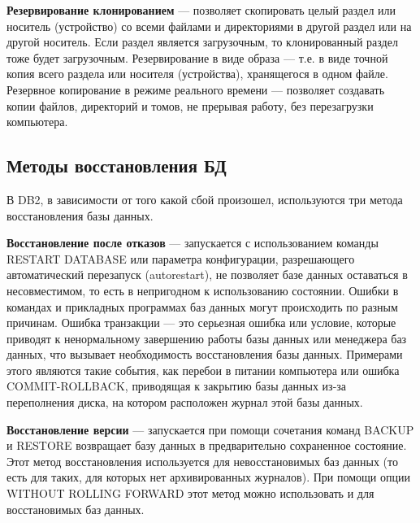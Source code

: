 \documentclass[russian,utf8,emptystyle]{eskdtext}
\begin{document}
\textbf{Резервирование клонированием} — позволяет скопировать целый раздел или носитель (устройство) со всеми файлами и директориями в другой раздел или на другой носитель. Если раздел является загрузочным, то клонированный раздел тоже будет загрузочным. Резервирование в виде образа — т.е. в виде точной копия всего раздела или носителя (устройства), хранящегося в одном
файле. Резервное копирование в режиме реального времени — позволяет создавать копии файлов, директорий и томов, не прерывая работу, без перезагрузки компьютера.

\subsection{Методы восстановления БД}
В DB2, в зависимости от того какой сбой произошел, используются три метода восстановления базы данных.

\textbf{Восстановление после отказов} — запускается с использованием команды RESTART DATABASE или параметра конфигурации, разрешающего автоматический перезапуск (autorestart), не позволяет базе данных оставаться в несовместимом, то есть в непригодном к использованию состоянии. Ошибки в командах и прикладных программах баз данных могут происходить по разным причинам. Ошибка транзакции — это серьезная ошибка или условие, которые приводят к ненормальному завершению работы базы данных или менеджера баз данных, что вызывает необходимость восстановления базы данных. Примерами этого являются такие события, как перебои в питании компьютера или ошибка COMMIT-ROLLBACK, приводящая к закрытию базы данных из-за переполнения диска, на котором расположен журнал этой базы данных.

\textbf{Восстановление версии} — запускается при помощи сочетания команд BACKUP и RESTORE возвращает базу данных в предварительно сохраненное состояние. Этот метод восстановления используется для невосстановимых баз данных (то есть для таких, для которых нет архивированных журналов). При помощи опции WITHOUT ROLLING FORWARD этот метод можно использовать и для восстановимых баз данных.
\end{document}
